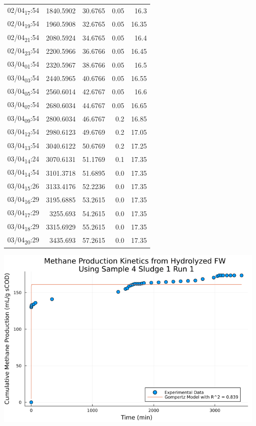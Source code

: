 \documentclass[11pt]{article}
\begin{document}
\begin{center}
\begin{tabular}{lrrrr}
02/04\textsubscript{17}:54 & 1840.5902 & 30.6765 & 0.05 & 16.3\\[0pt]
02/04\textsubscript{19}:54 & 1960.5908 & 32.6765 & 0.05 & 16.35\\[0pt]
02/04\textsubscript{21}:54 & 2080.5924 & 34.6765 & 0.05 & 16.4\\[0pt]
02/04\textsubscript{23}:54 & 2200.5966 & 36.6766 & 0.05 & 16.45\\[0pt]
03/04\textsubscript{01}:54 & 2320.5967 & 38.6766 & 0.05 & 16.5\\[0pt]
03/04\textsubscript{03}:54 & 2440.5965 & 40.6766 & 0.05 & 16.55\\[0pt]
03/04\textsubscript{05}:54 & 2560.6014 & 42.6767 & 0.05 & 16.6\\[0pt]
03/04\textsubscript{07}:54 & 2680.6034 & 44.6767 & 0.05 & 16.65\\[0pt]
03/04\textsubscript{09}:54 & 2800.6034 & 46.6767 & 0.2 & 16.85\\[0pt]
03/04\textsubscript{12}:54 & 2980.6123 & 49.6769 & 0.2 & 17.05\\[0pt]
03/04\textsubscript{13}:54 & 3040.6122 & 50.6769 & 0.2 & 17.25\\[0pt]
03/04\textsubscript{14}:24 & 3070.6131 & 51.1769 & 0.1 & 17.35\\[0pt]
03/04\textsubscript{14}:54 & 3101.3718 & 51.6895 & 0.0 & 17.35\\[0pt]
03/04\textsubscript{15}:26 & 3133.4176 & 52.2236 & 0.0 & 17.35\\[0pt]
03/04\textsubscript{16}:29 & 3195.6885 & 53.2615 & 0.0 & 17.35\\[0pt]
03/04\textsubscript{17}:29 & 3255.693 & 54.2615 & 0.0 & 17.35\\[0pt]
03/04\textsubscript{18}:29 & 3315.6929 & 55.2615 & 0.0 & 17.35\\[0pt]
03/04\textsubscript{20}:29 & 3435.693 & 57.2615 & 0.0 & 17.35\\[0pt]
\end{tabular}
\end{center}

\begin{center}
\includegraphics[width=.9\linewidth]{../plots/BMPs/Hydrolyzed FW/methane_kinetics_hydrolysate_4_s1_r1_min.png}
\end{center}
\end{document}
